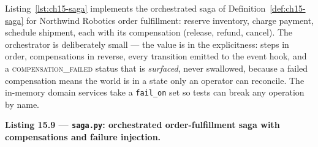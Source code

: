 Listing~\ref{lst:ch15-saga} implements the orchestrated saga of
Definition~\ref{def:ch15-saga} for Northwind Robotics order fulfillment:
reserve inventory, charge payment, schedule shipment, each with its
compensation (release, refund, cancel). The orchestrator is deliberately
small --- the value is in the explicitness: steps in order, compensations
in reverse, every transition emitted to the event hook, and a
\textsc{compensation\_failed} status that is \emph{surfaced}, never
swallowed, because a failed compensation means the world is in a state only
an operator can reconcile. The in-memory domain services take a
\texttt{fail\_on} set so tests can break any operation by name.

\noindent\textbf{Listing 15.9 --- \texttt{saga.py}:
orchestrated order-fulfillment saga with compensations and failure
injection.}
\label{lst:ch15-saga}
